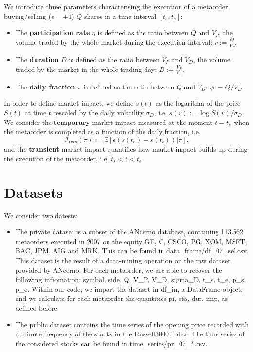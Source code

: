 \documentclass[12pt]{article}
\begin{document}
We introduce three parameters characterising the execution of a metaorder buying/selling ($\epsilon = \pm 1$) $Q$ shares in a time interval $[t_s,t_e]$:
\begin{itemize}
\item  The \textbf{participation rate} $\eta$ is defined as the ratio between $Q$ and $V_P$, the volume traded by the whole market during the execution interval: $\eta := \frac{Q}{V_P}$.
\item The \textbf{duration} $D$ is defined as the ratio between $V_P$ and $V_D$, the volume traded by the market in the whole trading day: $D := \frac{V_P}{V_D}$.
\item The \textbf{daily fraction} $\pi$ is defined as the ratio between $Q$ and $V_D$:  $\phi := {Q}/{V_D}$. 
\end{itemize}
In order to define market impact, we define $s(t)$ as the logarithm of the price $S(t)$ at time $t$ rescaled by the daily volatility $\sigma_D$, i.e. $s(v) := {\log S(v)}/{\sigma_D}$. We consider the \textbf{temporary} market impact measured at the moment $t=t_e$ when the metaorder is completed as a function of the daily fraction, i.e.
\begin{equation} \label{eq_imp_tmp}
\mathcal{I}_{tmp}(\pi) := \mathbb{E}\left[ \left. \epsilon \left( s(t_e) -s(t_s) \right)  \right|  \pi \right].
\end{equation} 
and the \textbf{transient} market impact quantifies how market impact builds up during the execution of the metaorder,  i.e. $t_s<t< t_e$.
\\

\section{Datasets}
We consider two datests:
\begin{itemize}
\item The private dataset is a subset of the ANcerno database, containing 113.562 metaorders executed in 2007 on the equity GE, C, CSCO, PG, XOM, MSFT, BAC, JPM, AIG and MRK. This can be found in \textsf{data\_frame/df\_07\_sel.csv}. This dataset is the result of a data-mining operation on the raw dataset provided by ANcerno. For each metaorder, we are able to recover the following infromation: \textsf{symbol, side, Q, V\_P, V\_D, sigma\_D, t\_s, t\_e, p\_s, p\_e}. Within our code, we import the dataset in \textsf{df\_in}, a \textsf{DataFrame} object, and we calculate for each metaorder the quantities \textsf{pi, eta, dur, imp}, as defined before.

\item The public dataset contains the time series of the opening price recorded with a minute frequency of the stocks in the Russell3000 index. The time series of the considered stocks can be found in \textsf{time\_series/pr\_07\_*.csv}.
\end{itemize}
\end{document}
